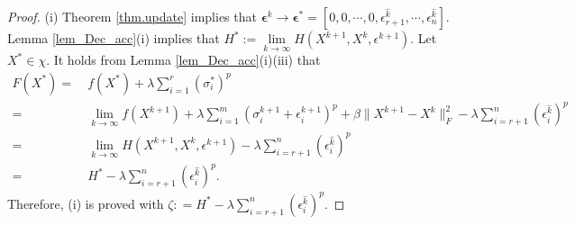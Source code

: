 \documentclass[twoside,11pt]{article}
\numberwithin{equation}{section}
\begin{document}
\begin{proof}
(i)  
  Theorem \ref{thm.update} implies that $\bm{\epsilon}^k\to \bm{\epsilon}^* = [0,0,\cdots,0,\epsilon_{r+1}^{\hat{k}},\cdots,\epsilon_{n}^{\hat{k}}]$. 
  Lemma \ref{lem_Dec_acc}(i) implies that 
    $H^* :=   \lim\limits_{k\to\infty  } H(X^{k+1},X^{k},\epsilon^{k+1})$.    
  Let $X^{*} \in \chi$. %
  It holds from   Lemma \ref{lem_Dec_acc}(i)(iii) that   
  \begin{equation*}
    \begin{aligned}
      F (X^{*}) 
    =&\ f (X^{*}) + \lambda\sum\limits_{i=1}^{r}(\sigma_i^*)^{p} \\
    =&\ \lim\limits_{k\to\infty } f(X^{k+1}) + \lambda\sum\limits_{i=1}^{m}(\sigma_i^{k+1} +\epsilon_{i}^{k+1})^{p} + \beta\|X^{k+1}-X^{k}\|_{F}^{2} - \lambda \sum\limits_{i=r +1}^{n} (\epsilon_{i}^{\hat{k}})^{p} \\
    =&\ \lim\limits_{k\to\infty  } H(X^{k+1},X^{k},\epsilon^{k+1})  - \lambda \sum\limits_{i=r +1}^{n} (\epsilon_{i}^{\hat{k}})^{p} \\
    =&\ H^*  - \lambda \sum\limits_{i=r +1}^{n} (\epsilon_{i}^{\hat{k}})^{p}. 
  \end{aligned}\end{equation*} 
  Therefore,  (i) is proved with $\zeta : = H^*  - \lambda \sum\limits_{i=r +1}^{n} (\epsilon_{i}^{\hat{k}})^{p}$. 
     

\end{proof}
\end{document}
